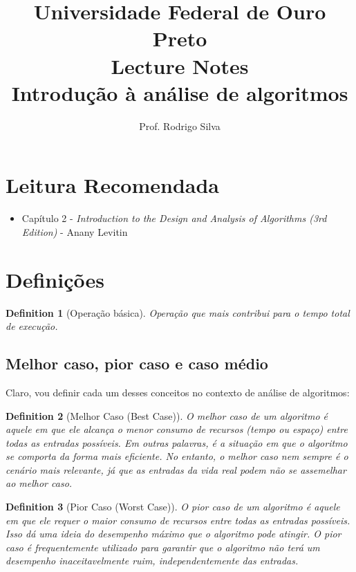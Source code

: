 \documentclass{article}
\title{\vspace{-2 cm}Universidade Federal de Ouro Preto \\ Lecture Notes \\ Introdução à análise de algoritmos}
\author{Prof. Rodrigo Silva}
\newtheorem{definition}{Definition}[section]
\begin{document}
\maketitle

\section*{Leitura Recomendada}

\begin{itemize}
    \item Capítulo 2 - \textit{Introduction to the Design and Analysis of Algorithms (3rd Edition)} - Anany Levitin 
\end{itemize}

\section{Definições}

\begin{definition}[Operação básica]
    Operação que mais contribui para o tempo total de execução.
\end{definition}

\subsection{Melhor caso, pior caso e caso médio}

Claro, vou definir cada um desses conceitos no contexto de análise de algoritmos:



\begin{definition}[Melhor Caso (Best Case)]
O melhor caso de um algoritmo é aquele em que ele alcança o menor consumo de recursos (tempo ou espaço) entre todas as entradas possíveis. Em outras palavras, é a situação em que o algoritmo se comporta da forma mais eficiente. No entanto, o melhor caso nem sempre é o cenário mais relevante, já que as entradas da vida real podem não se assemelhar ao melhor caso.
\end{definition}

\begin{definition}[Pior Caso (Worst Case)]
O pior caso de um algoritmo é aquele em que ele requer o maior consumo de recursos entre todas as entradas possíveis. Isso dá uma ideia do desempenho máximo que o algoritmo pode atingir. O pior caso é frequentemente utilizado para garantir que o algoritmo não terá um desempenho inaceitavelmente ruim, independentemente das entradas.
\end{definition}
\end{document}
